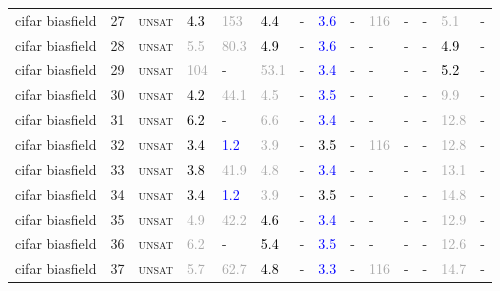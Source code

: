 \begin{center}
{\begin{longtable}{@{}llllllllllllll@{}}
cifar biasfield & 27 & \textsc{unsat} & \textcolor{black}{4.3} & \textcolor{darkgray}{153} & \textcolor{black}{4.4} & - & \textcolor{blue}{3.6} & - & \textcolor{darkgray}{116} & - & - & \textcolor{darkgray}{5.1} & - \\
cifar biasfield & 28 & \textsc{unsat} & \textcolor{darkgray}{5.5} & \textcolor{darkgray}{80.3} & \textcolor{black}{4.9} & - & \textcolor{blue}{3.6} & - & - & - & - & \textcolor{black}{4.9} & - \\
cifar biasfield & 29 & \textsc{unsat} & \textcolor{darkgray}{104} & - & \textcolor{darkgray}{53.1} & - & \textcolor{blue}{3.4} & - & - & - & - & \textcolor{black}{5.2} & - \\
cifar biasfield & 30 & \textsc{unsat} & \textcolor{black}{4.2} & \textcolor{darkgray}{44.1} & \textcolor{darkgray}{4.5} & - & \textcolor{blue}{3.5} & - & - & - & - & \textcolor{darkgray}{9.9} & - \\
cifar biasfield & 31 & \textsc{unsat} & \textcolor{black}{6.2} & - & \textcolor{darkgray}{6.6} & - & \textcolor{blue}{3.4} & - & - & - & - & \textcolor{darkgray}{12.8} & - \\
cifar biasfield & 32 & \textsc{unsat} & \textcolor{black}{3.4} & \textcolor{blue}{1.2} & \textcolor{darkgray}{3.9} & - & \textcolor{black}{3.5} & - & \textcolor{darkgray}{116} & - & - & \textcolor{darkgray}{12.8} & - \\
cifar biasfield & 33 & \textsc{unsat} & \textcolor{black}{3.8} & \textcolor{darkgray}{41.9} & \textcolor{darkgray}{4.8} & - & \textcolor{blue}{3.4} & - & - & - & - & \textcolor{darkgray}{13.1} & - \\
cifar biasfield & 34 & \textsc{unsat} & \textcolor{black}{3.4} & \textcolor{blue}{1.2} & \textcolor{darkgray}{3.9} & - & \textcolor{black}{3.5} & - & - & - & - & \textcolor{darkgray}{14.8} & - \\
cifar biasfield & 35 & \textsc{unsat} & \textcolor{darkgray}{4.9} & \textcolor{darkgray}{42.2} & \textcolor{black}{4.6} & - & \textcolor{blue}{3.4} & - & - & - & - & \textcolor{darkgray}{12.9} & - \\
cifar biasfield & 36 & \textsc{unsat} & \textcolor{darkgray}{6.2} & - & \textcolor{black}{5.4} & - & \textcolor{blue}{3.5} & - & - & - & - & \textcolor{darkgray}{12.6} & - \\
cifar biasfield & 37 & \textsc{unsat} & \textcolor{darkgray}{5.7} & \textcolor{darkgray}{62.7} & \textcolor{black}{4.8} & - & \textcolor{blue}{3.3} & - & \textcolor{darkgray}{116} & - & - & \textcolor{darkgray}{14.7} & - \\

\end{longtable}}
\end{center}
